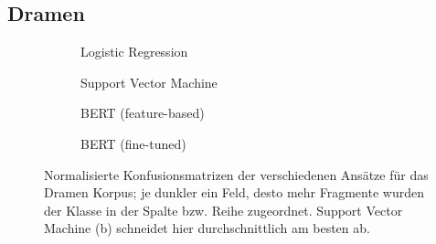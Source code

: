 \subsection{Dramen}
\label{dramen_diskussion}
\begin{figure}
\centering
\begin{subfigure}[b]{.45\linewidth}

\caption{Logistic Regression}\label{fig:drama-log}
\end{subfigure}
\begin{subfigure}[b]{.45\linewidth}

\caption{Support Vector Machine}\label{fig:drama-svm}
\end{subfigure}

\begin{subfigure}[b]{.45\linewidth}

\caption{BERT (feature-based)}\label{fig:drama-feat}
\end{subfigure}
\begin{subfigure}[b]{.45\linewidth}

\caption{BERT (fine-tuned)}\label{fig:drama-fine}
\end{subfigure}
\caption{Normalisierte Konfusionsmatrizen der verschiedenen Ansätze für das Dramen Korpus; je dunkler ein Feld, desto mehr Fragmente wurden der Klasse in der Spalte bzw. Reihe zugeordnet. Support Vector Machine (b) schneidet hier durchschnittlich am besten ab.}
\label{fig:drama}
\end{figure}





